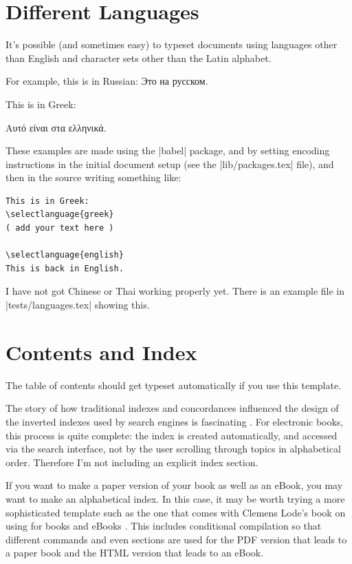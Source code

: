 \section{Different Languages}

It's possible (and sometimes easy) to typeset documents using languages other than English
and character sets other than the Latin alphabet.

For example, this is in Russian:
Это на русском.

This is in Greek:

Αυτό είναι στα ελληνικά.

These examples are made using the \sverb|babel| package, and by setting
encoding instructions in the initial document setup (see the \sverb|lib/packages.tex| file),
and then in the \latex source writing something like:

\begin{Verbatim}[fontsize=\footnotesize]
This is in Greek:
\selectlanguage{greek}
( add your text here )

\selectlanguage{english}
This is back in English.
\end{Verbatim}

I have not got Chinese or Thai working properly yet. There is an example file in \sverb|tests/languages.tex|
showing this.

\section{Contents and Index}

The table of contents should get typeset automatically if you use this template.

The story of how traditional indexes and concordances influenced the design of the inverted
indexes used by search engines is fascinating \citep[Ch 1]{witten1999gigabytes}.
For electronic books, this process is quite complete: the index is created automatically,
and accessed via the search interface, not by the user scrolling through topics in alphabetical order.
Therefore I'm not including an explicit index section.

If you want to make a paper
version of your book as well as an eBook, you may want to make an alphabetical index.
In this case, it may be worth trying a
more sophisticated template such as the one that comes with Clemens
Lode's book on using \latex for books and eBooks \citep{lode2019better}.
This includes conditional compilation so that different commands and even sections are used
for the PDF version that leads to a paper book and the HTML version that leads to an eBook.


